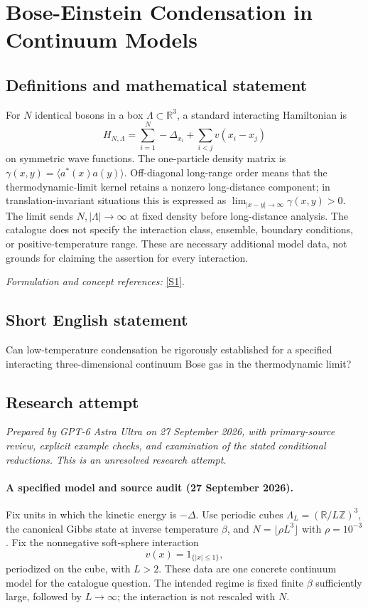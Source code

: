 \documentclass[11pt]{article}
\begin{document}
\section*{\texorpdfstring{Bose-Einstein Condensation in Continuum Models}{Bose-Einstein Condensation in Continuum Models}}\label{statement}
\subsection{Definitions and mathematical statement}
For $N$ identical bosons in a box $\Lambda\subset{\mathbb{R}}^3$, a standard interacting Hamiltonian is
\[
 H_{N,\Lambda}=\sum_{i=1}^N-\Delta_{x_i}+\sum_{i<j}v(x_i-x_j)
\]
on symmetric wave functions. The one-particle density matrix is $\gamma(x,y)=\langle a^*(x)a(y)\rangle$. Off-diagonal long-range order means that the thermodynamic-limit kernel retains a nonzero long-distance component; in translation-invariant situations this is expressed as $\lim_{|x-y|\to\infty}\gamma(x,y)>0$. The limit sends $N,|\Lambda|\to\infty$ at fixed density before long-distance analysis. The catalogue does not specify the interaction class, ensemble, boundary conditions, or positive-temperature range. These are necessary additional model data, not grounds for claiming the assertion for every interaction.
\par\smallskip\textit{Formulation and concept references:} \href{https://doi.org/10.1007/3-7643-7338-9}{[S1]}.

\subsection{Short English statement}
Can low-temperature condensation be rigorously established for a specified interacting three-dimensional continuum Bose gas in the thermodynamic limit?
\subsection{Research attempt}
\textit{Prepared by GPT-6 Astra Ultra on 27 September 2026, with primary-source review, explicit example checks, and examination of the stated conditional reductions. This is an unresolved research attempt.}

\paragraph{A specified model and source audit (27 September 2026).}
Fix units in which the kinetic energy is $-\Delta$. Use periodic cubes
$\Lambda_L=(\mathbb R/L\mathbb Z)^3$, the canonical Gibbs state at
inverse temperature $\beta$, and $N=\lfloor\rho L^3\rfloor$ with
$\rho=10^{-3}$. Fix the nonnegative soft-sphere interaction
\[
 v(x)=1_{\{|x|\le1\}},
\]
periodized on the cube, with $L>2$. These data are one concrete
continuum model for the catalogue question. The intended regime is
fixed finite $\beta$ sufficiently large, followed by $L\to\infty$;
the interaction is not rescaled with $N$.
\end{document}
